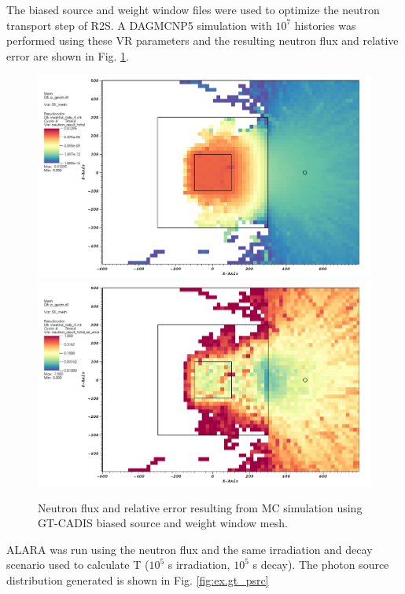 The biased source and weight window files were used to optimize the neutron
transport step of R2S.  A DAGMCNP5 simulation with $10^7$ histories was performed using these VR
parameters and the resulting neutron flux and relative error are shown in Fig.
\ref{fig:ex.gt_nflux}.

\begin{figure} 
	\includegraphics[scale=0.4]{figs/gtcadis_tot_n_f.png}
	\includegraphics[scale=0.4]{figs/gtcadis_tot_n_err.png}
	\caption [GT-CADIS neutron flux and relative error] 
	{Neutron flux and relative error resulting from MC simulation using
	 GT-CADIS biased source and weight window mesh.\label{fig:ex.gt_nflux}}
\end{figure}


ALARA was run using the neutron flux and the same irradiation and decay scenario used to calculate
T ($10^5$ s irradiation, $10^5$ s decay).  The photon source distribution generated is shown in Fig. \ref{fig:ex.gt_psrc}

